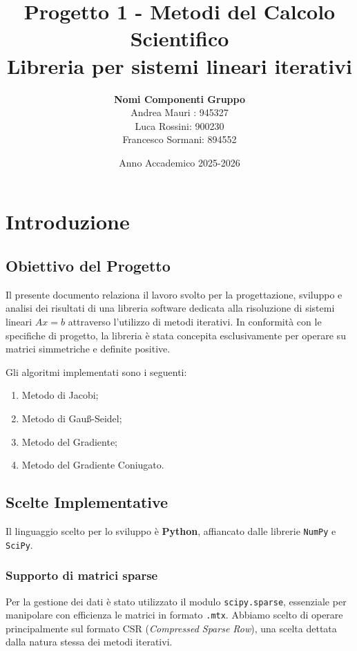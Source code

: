 \documentclass[a4paper, 12pt]{report}
\title{\Huge\textbf{Progetto 1 - Metodi del Calcolo Scientifico}\\ \vspace{0.5cm} \Large \textbf{Libreria per sistemi lineari iterativi}}
\author{\textbf{Nomi Componenti Gruppo} \\ Andrea Mauri : 945327 \\ Luca Rossini: 900230\\ Francesco Sormani: 894552}
\date{Anno Accademico 2025-2026}
\begin{document}
\maketitle

\tableofcontents
\newpage

\chapter{Introduzione}
\section{Obiettivo del Progetto}
Il presente documento relaziona il lavoro svolto per la progettazione, sviluppo e analisi dei risultati di una libreria software dedicata alla risoluzione di sistemi lineari $Ax = b$ attraverso l'utilizzo di metodi iterativi. In conformità con le specifiche di progetto, la libreria è stata concepita esclusivamente per operare su matrici simmetriche e definite positive.

\noindent Gli algoritmi implementati sono i seguenti:
\begin{enumerate}
    \item Metodo di Jacobi;
    \item Metodo di Gauß-Seidel;
    \item Metodo del Gradiente;
    \item Metodo del Gradiente Coniugato.
\end{enumerate}

\section{Scelte Implementative}
Il linguaggio scelto per lo sviluppo è \textbf{Python}, affiancato dalle librerie \texttt{NumPy} e \texttt{SciPy}.
\subsection{Supporto di matrici sparse}
Per la gestione dei dati è stato utilizzato il modulo \texttt{scipy.sparse}, essenziale per manipolare con efficienza le matrici in formato \texttt{.mtx}. Abbiamo scelto di operare principalmente sul formato CSR (\textit{Compressed Sparse Row}), una scelta dettata dalla natura stessa dei metodi iterativi.
\end{document}
